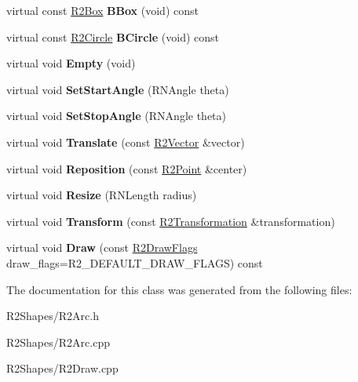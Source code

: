 \begin{DoxyCompactItemize}
\item 
virtual const \hyperlink{class_r2_box}{R2\+Box} {\bfseries B\+Box} (void) const \hypertarget{class_r2_arc_a330e00729b7986c609751338576ba8ea}{}\label{class_r2_arc_a330e00729b7986c609751338576ba8ea}

\item 
virtual const \hyperlink{class_r2_circle}{R2\+Circle} {\bfseries B\+Circle} (void) const \hypertarget{class_r2_arc_a18450649651040aa4eb125f6ab7a4171}{}\label{class_r2_arc_a18450649651040aa4eb125f6ab7a4171}

\item 
virtual void {\bfseries Empty} (void)\hypertarget{class_r2_arc_a6dca2ff474041fc577195408a5c576e9}{}\label{class_r2_arc_a6dca2ff474041fc577195408a5c576e9}

\item 
virtual void {\bfseries Set\+Start\+Angle} (R\+N\+Angle theta)\hypertarget{class_r2_arc_a03a88e8c029e26d72c1df2e52b9b0e91}{}\label{class_r2_arc_a03a88e8c029e26d72c1df2e52b9b0e91}

\item 
virtual void {\bfseries Set\+Stop\+Angle} (R\+N\+Angle theta)\hypertarget{class_r2_arc_abdcef205613cc05a84f7fb1475fc9381}{}\label{class_r2_arc_abdcef205613cc05a84f7fb1475fc9381}

\item 
virtual void {\bfseries Translate} (const \hyperlink{class_r2_vector}{R2\+Vector} \&vector)\hypertarget{class_r2_arc_a72ae89551a111a2bde6f81e4f9fa092a}{}\label{class_r2_arc_a72ae89551a111a2bde6f81e4f9fa092a}

\item 
virtual void {\bfseries Reposition} (const \hyperlink{class_r2_point}{R2\+Point} \&center)\hypertarget{class_r2_arc_ade95d2c9283d5d180bfa4d640aa082f8}{}\label{class_r2_arc_ade95d2c9283d5d180bfa4d640aa082f8}

\item 
virtual void {\bfseries Resize} (R\+N\+Length radius)\hypertarget{class_r2_arc_a13b4a2d7f1805515f072ba28b530d7ae}{}\label{class_r2_arc_a13b4a2d7f1805515f072ba28b530d7ae}

\item 
virtual void {\bfseries Transform} (const \hyperlink{class_r2_transformation}{R2\+Transformation} \&transformation)\hypertarget{class_r2_arc_aefb2550eb245b6990a93babdcab01ad2}{}\label{class_r2_arc_aefb2550eb245b6990a93babdcab01ad2}

\item 
virtual void {\bfseries Draw} (const \hyperlink{class_r_n_flags}{R2\+Draw\+Flags} draw\+\_\+flags=R2\+\_\+\+D\+E\+F\+A\+U\+L\+T\+\_\+\+D\+R\+A\+W\+\_\+\+F\+L\+A\+GS) const \hypertarget{class_r2_arc_af2059271304ead9264f2546890a986b3}{}\label{class_r2_arc_af2059271304ead9264f2546890a986b3}

\end{DoxyCompactItemize}


The documentation for this class was generated from the following files\+:\begin{DoxyCompactItemize}
\item 
R2\+Shapes/R2\+Arc.\+h\item 
R2\+Shapes/R2\+Arc.\+cpp\item 
R2\+Shapes/R2\+Draw.\+cpp\end{DoxyCompactItemize}
